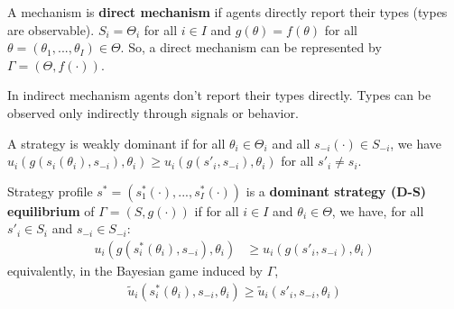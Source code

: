 \documentclass[11pt]{elegantbook}
\begin{document}
\begin{definition}
    \normalfont
    A mechanism is \textbf{direct mechanism} if agents directly report their types (types are observable). $S_i=\Theta_i$ for all $i\in I$ and $g(\theta)=f(\theta)$ for all $\theta=(\theta_1,...,\theta_I)\in\Theta$. So, a direct mechanism can be represented by $\Gamma=(\Theta,f(\cdot))$.
\end{definition}
In indirect mechanism agents don't report their types directly. Types can be observed only indirectly through signals or behavior.

A strategy is weakly dominant if for all $\theta_i\in\Theta_i$ and all $s_{-i}(\cdot)\in S_{-i}$, we have $u_i(g(s_i(\theta_i),s_{-i}),\theta_i)\geq u_i(g(s'_i,s_{-i}),\theta_i)$ for all $s'_i\neq s_i$.


\begin{definition}
    \normalfont
    Strategy profile $s^*=(s_1^*(\cdot),...,s_I^*(\cdot))$ is a \textbf{dominant strategy (D-S) equilibrium} of $\Gamma=(S,g(\cdot))$ if for all $i\in I$ and $\theta_i\in \Theta$, we have, for all $s'_i\in S_i$ and $s_{-i}\in S_{-i}$:
    \begin{equation}
        \begin{aligned}
            u_i(g(s_i^*(\theta_i),s_{-i}),\theta_i)&\geq u_i(g(s'_i,s_{-i}),\theta_i)
        \end{aligned}
        \nonumber
    \end{equation}
    equivalently, in the Bayesian game induced by $\Gamma$,
    \begin{equation}
        \begin{aligned}
            \tilde{u}_i(s_i^*(\theta_i),s_{-i},\theta_i)\geq \tilde{u}_i(s'_i,s_{-i},\theta_i)
        \end{aligned}
        \nonumber
    \end{equation}
\end{definition}
\end{document}
